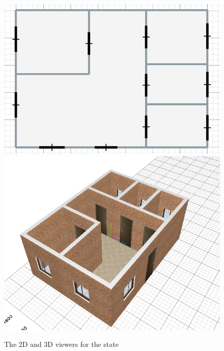 \begin{figure}[htb]
\centering
\includegraphics[width=0.45\linewidth]{contents/images/2d-viewer}
\includegraphics[width=0.45\linewidth]{contents/images/3d-viewer}
\caption{The 2D and 3D viewers for the state}
\label{fig_viewer}
\end{figure}

